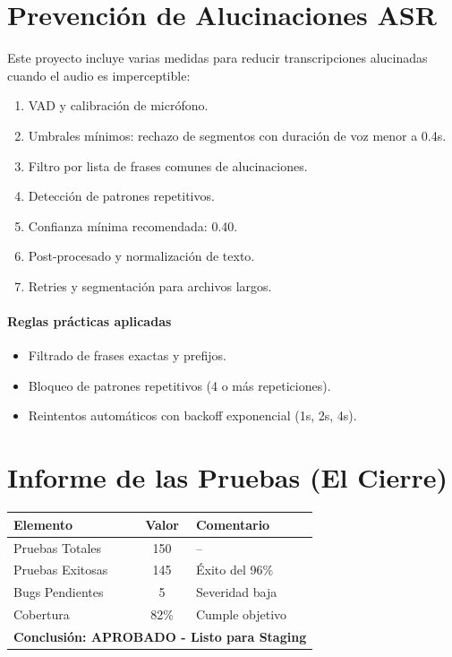 \documentclass[12pt,a4paper]{article}
\begin{document}
\section{Prevención de Alucinaciones ASR}
Este proyecto incluye varias medidas para reducir transcripciones alucinadas cuando el audio es imperceptible:
\begin{enumerate}
  \item VAD y calibración de micrófono.
  \item Umbrales mínimos: rechazo de segmentos con duración de voz menor a 0.4s.
  \item Filtro por lista de frases comunes de alucinaciones.
  \item Detección de patrones repetitivos.
  \item Confianza mínima recomendada: 0.40.
  \item Post-procesado y normalización de texto.
  \item Retries y segmentación para archivos largos.
\end{enumerate}

\paragraph{Reglas prácticas aplicadas}
\begin{itemize}
  \item Filtrado de frases exactas y prefijos.
  \item Bloqueo de patrones repetitivos (4 o más repeticiones).
  \item Reintentos automáticos con backoff exponencial (1s, 2s, 4s).
\end{itemize}

\section{Informe de las Pruebas (El Cierre)}
\begin{table}[h!]
\centering
\renewcommand{\arraystretch}{1.2}
\begin{tabular}{|l|c|l|}
\hline
\rowcolor{headergrey} \textbf{Elemento} & \textbf{Valor} & \textbf{Comentario} \\ \hline
Pruebas Totales & 150 & -- \\ \hline
Pruebas Exitosas & 145 & \cellcolor{statusgreen} Éxito del 96\% \\ \hline
Bugs Pendientes & 5 & \cellcolor{statusyellow} Severidad baja \\ \hline
Cobertura & 82\% & \cellcolor{statusgreen} Cumple objetivo \\ \hline
\multicolumn{3}{|l|}{\cellcolor{statusgreen} \textbf{Conclusión: APROBADO - Listo para Staging}} \\ \hline
\end{tabular}
\end{table}
\end{document}
